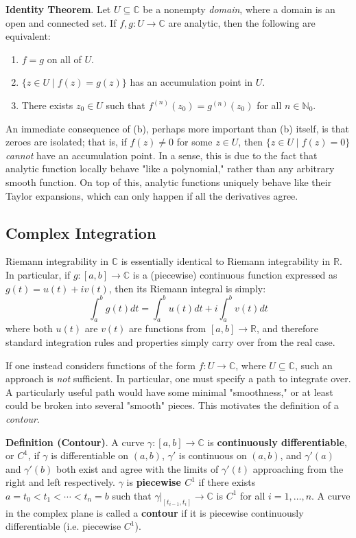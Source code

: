 \textbf{Identity Theorem}. Let $U\subseteq\mathbb{C}$ be a nonempty \textit{domain}, where a domain is an open and connected set. If $f,g:U\to\mathbb{C}$ are analytic, then the following are equivalent:\vspace{-1em}\begin{enumerate}
    \item[(a)] $f = g$ on all of $U$.
    \item[(b)] $\{z\in U\mid f(z)=g(z)\}$ has an accumulation point in $U$.
    \item[(c)] There exists $z_0\in U$ such that $f^{(n)}(z_0) = g^{(n)}(z_0)$ for all $n\in\mathbb{N}_0$.
\end{enumerate} 
\vspace{-1em}
An immediate consequence of (b), perhaps more important than (b) itself, is that zeroes are isolated; that is, if $f(z)\neq 0$ for some $z\in U$, then $\{z\in U\mid f(z)=0\}$ \textit{cannot} have an accumulation point. In a sense, this is due to the fact that analytic function locally behave "like a polynomial," rather than any arbitrary smooth function. On top of this, analytic functions uniquely behave like their Taylor expansions, which can only happen if all the derivatives agree.

\subsection{Complex Integration}

Riemann integrability in $\mathbb{C}$ is essentially identical to Riemann integrability in $\mathbb{R}$. In particular, if $g:[a,b]\to\mathbb{C}$ is a (piecewise) continuous function expressed as $g(t) = u(t) + iv(t)$, then its Riemann integral is simply: \[\int_a^b g(t)dt = \int_a^b u(t)dt + i\int_a^b v(t)dt\] where both $u(t)$ are $v(t)$ are functions from $[a,b]\to\mathbb{R}$, and therefore standard integration rules and properties simply carry over from the real case.

If one instead considers functions of the form $f:U\to\mathbb{C}$, where $U\subseteq\mathbb{C}$, such an approach is \textit{not} sufficient. In particular, one must specify a path to integrate over. A particularly useful path would have some minimal "smoothness," or at least could be broken into several "smooth" pieces. This motivates the definition of a \textit{contour}.

\textbf{Definition (Contour)}. A curve $\gamma:[a,b]\to\mathbb{C}$ is \textbf{continuously differentiable}, or $C^1$, if $\gamma$ is differentiable on $(a,b)$, $\gamma'$ is continuous on $(a,b)$, and $\gamma'(a)$ and $\gamma'(b)$ both exist and agree with the limits of $\gamma'(t)$ approaching from the right and left respectively. $\gamma$ is \textbf{piecewise $C^1$} if there exists $a=t_0<t_1<\cdots<t_n=b$ such that $\gamma|_{[t_{i-1},t_i]}\to\mathbb{C}$ is $C^1$ for all $i=1,\dots,n$. A curve in the complex plane is called a \textbf{contour} if it is piecewise continuously differentiable (i.e. piecewise $C^1$).

